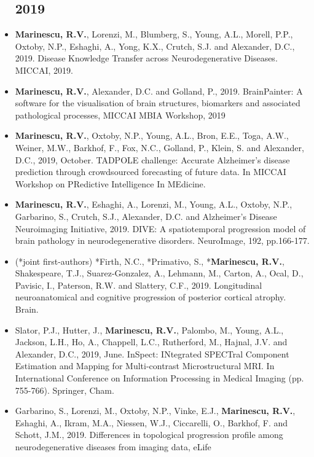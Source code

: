 \documentclass[a4paper,10pt]{article} %
\begin{document}
\begin{itemize}
\subsection*{2019}
\item[\poster] \textbf{Marinescu, R.V.}, Lorenzi, M., Blumberg, S., Young, A.L., Morell, P.P., Oxtoby, N.P., Eshaghi, A., Yong, K.X., Crutch, S.J. and Alexander, D.C., 2019. Disease Knowledge Transfer across Neurodegenerative Diseases. MICCAI, 2019.
\item[\talk] \textbf{Marinescu, R.V.}, Alexander, D.C. and Golland, P., 2019. BrainPainter: A software for the visualisation of brain structures, biomarkers and associated pathological processes, MICCAI MBIA Workshop, 2019
\item[\talk] \textbf{Marinescu, R.V.}, Oxtoby, N.P., Young, A.L., Bron, E.E., Toga, A.W., Weiner, M.W., Barkhof, F., Fox, N.C., Golland, P., Klein, S. and Alexander, D.C., 2019, October. TADPOLE challenge: Accurate Alzheimer's disease prediction through crowdsourced forecasting of future data. In MICCAI Workshop on PRedictive Intelligence In MEdicine.
\item[\journal] \textbf{Marinescu, R.V.}, Eshaghi, A., Lorenzi, M., Young, A.L., Oxtoby, N.P., Garbarino, S., Crutch, S.J., Alexander, D.C. and Alzheimer's Disease Neuroimaging Initiative, 2019. DIVE: A spatiotemporal progression model of brain pathology in neurodegenerative disorders. NeuroImage, 192, pp.166-177.
\item[\journal] (*joint first-authors) *Firth, N.C., *Primativo, S., *\textbf{Marinescu, R.V.}, Shakespeare, T.J., Suarez-Gonzalez, A., Lehmann, M., Carton, A., Ocal, D., Pavisic, I., Paterson, R.W. and Slattery, C.F., 2019. Longitudinal neuroanatomical and cognitive progression of posterior cortical atrophy. Brain.
\item[\poster] Slator, P.J., Hutter, J., \textbf{Marinescu, R.V.}, Palombo, M., Young, A.L., Jackson, L.H., Ho, A., Chappell, L.C., Rutherford, M., Hajnal, J.V. and Alexander, D.C., 2019, June. InSpect: INtegrated SPECTral Component Estimation and Mapping for Multi-contrast Microstructural MRI. In International Conference on Information Processing in Medical Imaging (pp. 755-766). Springer, Cham.
\item[\journal] Garbarino, S., Lorenzi, M., Oxtoby, N.P., Vinke, E.J., \textbf{Marinescu, R.V.}, Eshaghi, A., Ikram, M.A., Niessen, W.J., Ciccarelli, O., Barkhof, F. and Schott, J.M., 2019. Differences in topological progression profile among neurodegenerative diseases from imaging data, eLife



\end{itemize}
\end{document}
